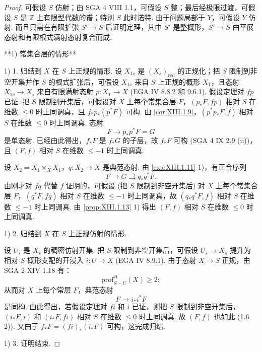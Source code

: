 \begin{proof}
可假设 $S$ 仿射；由 SGA 4 VIII 1.1，可假设 $S$ 整；最后经极限过渡，可假设 $S$ 是 $\mathbb{Z}$ 上有限型代数的谱；特别 $S$ 此时诺特. 由于问题局部于 $Y$，可假设 $Y$ 仿射. 而且只需在有限扩张 $S' \to S$ 后证明定理，其中 $S'$ 是整概形，$S' \to S$ 由平展态射和有限根式满射态射复合而成.

**1) 常集合层的情形**

1) 1. 归结到 $X$ 在 $S$ 上正规的情形. 设 $X_{1s}$ 是 $(X_s)_{\mathrm{r\acute{e}d}}$ 的正规化；把 $S$ 限制到非空开集并作 $S$ 的根式扩张后，可假设 $X_{1s}$ 来自 $S$ 上正规的概形 $X_1$，且态射 $X_{1s} \to X_s$ 来自有限满射态射 $p \colon X_1 \to X$ (EGA IV 8.8.2 和 9.6.1). 假设定理对 $fp$ 已证. 把 $S$ 限制到开集后，可假设对 $X$ 上每个常集合层 $F$，$(p_* F, fp)$ 相对 $S$ 在维数 $\leqslant 0$ 时上同调真，且 $f_* p_*(p^{*} F)$ 可构. 由 \ref{cor:XIII.1.9}，$(p^{*} p_* F, f)$ 相对 $S$ 在维数 $\leqslant 0$ 时上同调真. 态射
\[
F \longrightarrow p_* p^{*} F = G
\]
是单态射. 已经由此得出，$f_* F$ 是 $f_* G$ 的子层，故 $f_* F$ 可构 (SGA 4 IX 2.9 (ii))，且 $(F, f)$ 相对 $S$ 在维数 $\leqslant -1$ 时上同调真.

设 $X_2 = X_1 \times_X X_1$，$q \colon X_2 \to X$ 是典范态射. 由 \ref{exa:XIII.1.11} 1)，有正合序列
\[
F \longrightarrow G \rightrightarrows q_* q^{*} F.
\]
由刚才对 $fq$ 代替 $f$ 证明的，可假设 (把 $S$ 限制到非空开集后) 对 $X$ 上每个常集合层 $F$，$(q^{*} F, fq)$ 相对 $S$ 在维数 $\leqslant -1$ 时上同调真，故 $(q_* q^{*} F, f)$ 相对 $S$ 在维数 $\leqslant -1$ 时上同调真. 由 \ref{prop:XIII.1.13} 1) 得出 $(F, f)$ 相对 $S$ 在维数 $\leqslant 0$ 时上同调真.

1) 2. 归结到 $X$ 在 $S$ 上正规仿射的情形.

设 $U_s$ 是 $X_s$ 的稠密仿射开集. 把 $S$ 限制到非空开集后，可假设 $U_s \to X_s$ 提升为相对 $S$ 概形支配的开浸入 $i \colon U \to X$ (EGA IV 8.9.1). 由于态射 $X \to S$ 正规，由 SGA 2 XIV 1.18 有：
\[
\mathrm{prof}^{\mathrm{ét}}_{S-U}(X) \geqslant 2;
\]
从而对 $X$ 上每个常层 $F$，典范态射
\[
F \longrightarrow i_* i^{*} F
\]
是同构. 由此得出，若假设定理对 $fi$ 和 $i$ 已证，则把 $S$ 限制到非空开集后，$(i_* F, i)$ 和 $(i_* F, fi)$ 相对 $S$ 在维数 $\leqslant 0$ 时上同调真. 故 $(F, f)$ 也如此 (1.6 2)). 又由于 $f_* F = (fi)_*(i_* F)$ 可构，这完成归结.

1) 3. 证明结束.


\end{proof}
